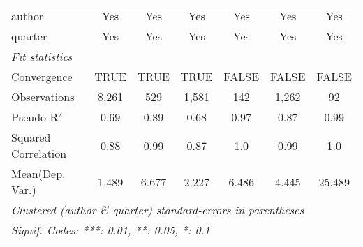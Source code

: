 \begin{tabular}{lcccccc}
   author                                                     & Yes           & Yes           & Yes           & Yes            & Yes           & Yes\\  
   quarter                                                    & Yes           & Yes           & Yes           & Yes            & Yes           & Yes\\  
   \midrule
   \emph{Fit statistics}\\
   Convergence                                                &TRUE           & TRUE          & TRUE          & FALSE          & FALSE         & FALSE\\  
   Observations                                               & 8,261         & 529           & 1,581         & 142            & 1,262         & 92\\  
   Pseudo R$^2$                                               & 0.69          & 0.89          & 0.68          & 0.97           & 0.87          & 0.99\\  
   Squared Correlation                                        & 0.88          & 0.99          & 0.87          & 1.0            & 0.99          & 1.0\\  
Mean(Dep. Var.) & 1.489 & 6.677 & 2.227 & 6.486 & 4.445 & 25.489 \\
   \midrule \midrule
   \multicolumn{7}{l}{\emph{Clustered (author \& quarter) standard-errors in parentheses}}\\
   \multicolumn{7}{l}{\emph{Signif. Codes: ***: 0.01, **: 0.05, *: 0.1}}\\
\end{tabular}
\par\endgroup
